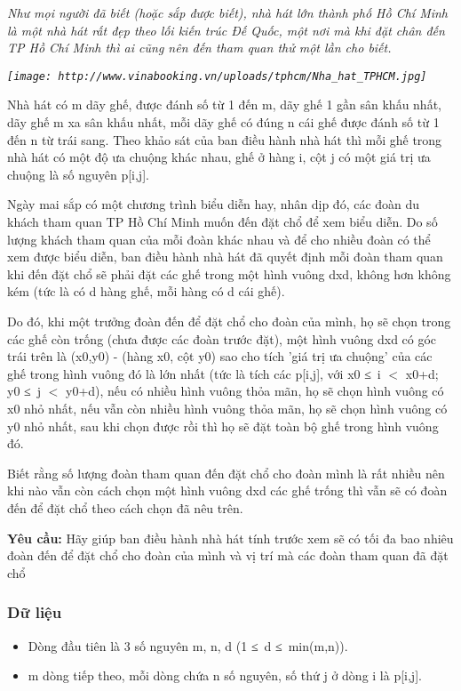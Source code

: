 



\emph{    Như mọi người đã biết (hoặc sắp được biết), nhà hát lớn thành phố Hồ Chí Minh là một nhà hát rất đẹp theo lối kiến trúc Đế Quốc, một nơi mà khi đặt chân đến TP Hồ Chí Minh thì ai cũng nên đến tham quan thử một lần cho biết.   }

\emph{
\texttt{[image: http://www.vinabooking.vn/uploads/tphcm/Nha\_hat\_TPHCM.jpg]}}

   Nhà hát có m dãy ghế, được đánh số từ 1 đến m, dãy ghế 1 gần sân khấu nhất, dãy ghế m xa sân khấu nhất, mỗi dãy ghế có đúng n cái ghế được đánh số từ 1 đến n từ trái sang. Theo khảo sát của ban điều hành nhà hát thì mỗi ghế trong nhà hát có một độ ưa chuộng khác nhau, ghế ở hàng i, cột j có một giá trị ưa chuộng là số nguyên p[i,j].  

   Ngày mai sắp có một chương trình biểu diễn hay, nhân dịp đó, các đoàn du khách tham quan TP Hồ Chí Minh muốn đến đặt chổ để xem biểu diễn. Do số lượng khách tham quan của mỗi đoàn khác nhau và để cho nhiều đoàn có thể xem được biểu diễn, ban điều hành nhà hát đã quyết định mỗi đoàn tham quan khi đến đặt chổ sẽ phải đặt các ghế trong một hình vuông dxd, không hơn không kém (tức là có d hàng ghế, mỗi hàng có d cái ghế).  

   Do đó, khi một trưởng đoàn đến để đặt chổ cho đoàn của mình, họ sẽ chọn trong các ghế còn trống (chưa được các đoàn trước đặt), một hình vuông dxd có góc trái trên là (x0,y0) - (hàng x0, cột y0) sao cho tích 'giá trị ưa chuộng' của các ghế trong hình vuông đó là lớn nhất (tức là tích các p[i,j], với x0 ≤ i $<$ x0+d; y0 ≤ j $<$ y0+d), nếu có nhiều hình vuông thỏa mãn, họ sẽ chọn hình vuông có x0 nhỏ nhất, nếu vẫn còn nhiều hình vuông thỏa mãn, họ sẽ chọn hình vuông có y0 nhỏ nhất, sau khi chọn được rồi thì họ sẽ đặt toàn bộ ghế trong hình vuông đó.  

   Biết rằng số lượng đoàn tham quan đến đặt chổ cho đoàn mình là rất nhiều nên khi nào vẫn còn cách chọn một hình vuông dxd các ghế trống thì vẫn sẽ có đoàn đến để đặt chổ theo cách chọn đã nêu trên.  

\textbf{    Yêu cầu:   }   Hãy giúp ban điều hành nhà hát tính trước xem sẽ có tối đa bao nhiêu đoàn đến để đặt chổ cho đoàn của mình và vị trí mà các đoàn tham quan đã đặt chổ  

\subsubsection{   Dữ liệu  }
\begin{itemize}
	\item     Dòng đầu tiên là 3 số nguyên m, n, d (1 ≤ d ≤ min(m,n)).   
	\item     m dòng tiếp theo, mỗi dòng chứa n số nguyên, số thứ j ở dòng i là p[i,j].   
\end{itemize}

